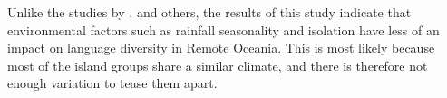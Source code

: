 \documentclass[unnumsec,webpdf,modern,medium]{oup-authoring-template}
\begin{document}

Unlike the studies by \citet{gavin2012island}, \citet{hua2019ecological} and others, the results of this study indicate that environmental factors such as rainfall seasonality and isolation have less of an impact on language diversity in Remote Oceania. This is most likely because most of the island groups share a similar climate, and there is therefore not enough variation to tease them apart.


\end{document}
